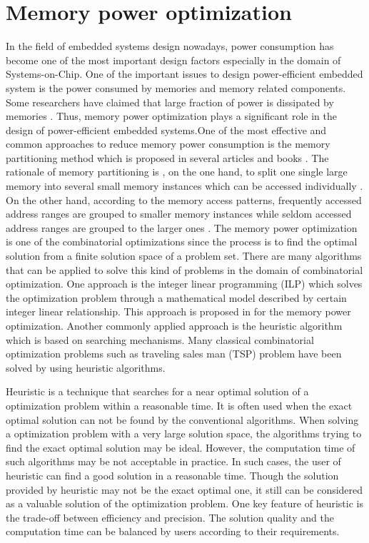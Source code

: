 \label{chap:introduction}
	\section{Memory power optimization}
	\label{sec:memory_power_optim}
	In the field of embedded systems design nowadays, power consumption has become one of the most important design factors especially in the domain of Systems-on-Chip. One of the important issues to design power-efficient embedded system is the power consumed by memories and memory related components. Some researchers have claimed that large fraction of power is dissipated by
	memories \cite{876761, 4415607}. Thus, memory power optimization plays a significant role in the design of power-efficient embedded systems.One of the most effective and common approaches to reduce memory power consumption is the memory partitioning method which is proposed in several articles and books \cite[p.43]{Strobel2016, 876761, 4415607, Hiser:2005:EAP:1088093, macii2002memory}.
	The rationale of memory partitioning is , on the one hand, to split one single large memory into several small memory instances which can be accessed individually \cite{4415607}. On the other hand, according to the memory access patterns, frequently accessed address ranges are grouped to smaller memory instances while seldom accessed address ranges are grouped 
	to the larger ones \cite{Strobel2016}.
	The memory power optimization is one of the combinatorial optimizations since the process is to find the optimal solution from a finite solution space of a problem set. There are many algorithms that can be applied to solve this kind of problems in the domain of combinatorial optimization.
	One approach is the integer linear programming (ILP) which solves the optimization problem through a 
	mathematical model described by certain integer linear relationship. This approach is proposed in
	\cite{Strobel2016} for the memory power optimization. Another commonly applied approach is the
	heuristic algorithm which is based on searching mechanisms. Many classical combinatorial optimization
	problems such as traveling sales man (TSP) problem have been solved by using heuristic algorithms.
	
	Heuristic is a technique that searches for a near optimal solution of a optimization problem within
	a reasonable time. It is often used when the exact optimal solution can not be found by the conventional
	algorithms. When solving a optimization problem with a very large solution space, the algorithms trying to
	find the exact optimal solution may be ideal. However, the computation time of such algorithms may be not
	acceptable in practice. In such cases, the user of heuristic can find a good solution in a reasonable
	time. Though the solution provided by heuristic may not be the exact optimal one, it still can be
	considered as a valuable solution of the optimization problem. One key feature of heuristic is the
	trade-off between efficiency and precision. The solution quality and the computation time can be balanced by
	users according to their requirements.
	
